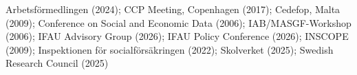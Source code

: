 Arbetsförmedlingen (2024); CCP Meeting, Copenhagen (2017); Cedefop, Malta (2009); Conference on Social and Economic Data (2006); IAB/MASGF-Workshop (2006); IFAU Advisory Group (2026); IFAU Policy Conference (2026); INSCOPE (2009); Inspektionen för socialförsäkringen (2022); Skolverket (2025); Swedish Research Council (2025)%
